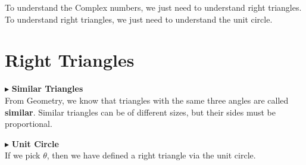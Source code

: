 \documentclass{ximera}
\begin{document}
To understand the Complex numbers, we just need to understand right triangles.  To understand right triangles, we just need to understand the unit circle.







\section{Right Triangles}




$\blacktriangleright$ \textbf{Similar Triangles} \\

From Geometry, we know that triangles with the same three angles are called \textbf{similar}.  Similar triangles can be of different sizes, but their sides must be proportional.







$\blacktriangleright$ \textbf{Unit Circle} \\




If we pick $\theta$, then we have defined a right triangle via the unit circle.
\end{document}

